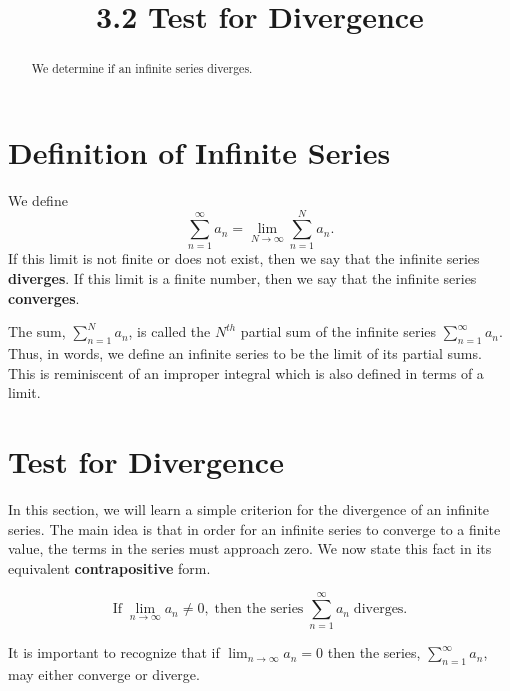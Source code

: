 \documentclass{ximera}
\title{3.2 Test for Divergence}
\begin{document}
\begin{abstract}
We determine if an infinite series diverges.
\end{abstract}

\maketitle

\section{Definition of Infinite Series}

\begin{definition}
We define
\[\sum_{n=1}^\infty a_n = \lim_{N \to \infty} \sum_{n=1}^N a_n.\]
If this limit is not finite or does not exist, then we say that the infinite series \textbf{diverges}.
If this limit is a finite number, then we say that the infinite series \textbf{converges}.
\end{definition}

\begin{remark}
The sum, $\displaystyle{\sum_{n=1}^N a_n}$, is called the $N^{th}$ partial sum of the infinite series
$\displaystyle{\sum_{n=1}^\infty a_n}$. Thus, in words, we define an infinite series to be the limit of its partial sums.
This is reminiscent of an improper integral which is also defined in terms of a limit.
\end{remark}

\section{Test for Divergence}

In this section, we will learn a simple criterion for the divergence of an infinite series.
The main idea is that in order for an infinite series to converge to a finite value, the terms in the series
must approach zero. We now state this fact in its equivalent \textbf{contrapositive} form.


\begin{theorem}


\[
\text{If}  \; \lim_{n\to \infty} a_n \neq 0,
\; \text{then the series} \;
\sum_{n=1}^\infty a_n \;
\text{diverges.}
\]

\end{theorem}

\begin{remark}
It is important to recognize that if $\displaystyle{\lim_{n \to \infty} a_n = 0}$ then the series, $\displaystyle{\sum_{n=1}^\infty a_n}$, may either converge or diverge.
\end{remark}
\end{document}
